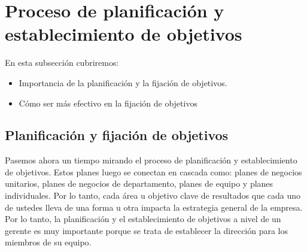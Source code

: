 \documentclass[10pt]{book}
\begin{document}
\section{Proceso de planificación y establecimiento de objetivos}
En esta subsección cubriremos:\\
\begin{itemize}
\item Importancia de la planificación y la fijación de objetivos.
\item Cómo ser más efectivo en la fijación de objetivos 
\end{itemize}
\subsection{Planificación y fijación de objetivos}
Pasemos ahora un tiempo mirando el proceso de planificación y establecimiento de objetivos. Estos planes luego se conectan en cascada como: planes de negocios unitarios, planes de negocios de departamento, planes de equipo y planes individuales. Por lo tanto, cada área u objetivo clave de resultados que cada uno de ustedes lleva de una forma u otra impacta la estrategia general de la empresa. Por lo tanto, la planificación y el establecimiento de objetivos a nivel de un gerente es muy importante porque se trata de establecer la dirección para los miembros de su equipo. \\
\end{document}
